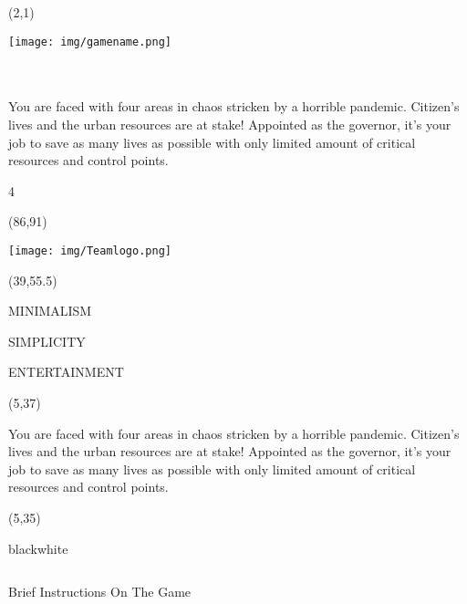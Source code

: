 \documentclass[hyperref={pdfpagelabels=false}]{beamer}
\begin{document}
\begin{frame}

	\begin{textblock}{45}(2,1)
		\begin{blankbox}
			\texttt{[image: img/gamename.png]} \\\hspace*{\fill} \\ \\\hspace*{\fill}

			\huge{You are faced with four areas in chaos stricken by a horrible pandemic. Citizen's lives and the urban resources are at stake! Appointed as the governor, it's your job to save as many lives as possible with only limited amount of critical resources and control points.}
		\end{blankbox}
	\end{textblock}

4	\begin{textblock}{30}(86,91)
		\begin{blankbox}
			\texttt{[image: img/Teamlogo.png]}

		\end{blankbox}
	\end{textblock}

	\begin{textblock}{20}(39,55.5)
		\begin{blankbox}
\centering
			\Huge MINIMALISM

\vspace{1cm}

			SIMPLICITY
\vspace{1cm}

ENTERTAINMENT
		\end{blankbox}
	\end{textblock}



\begin{textblock}{45}(5,37)
		\begin{blankbox}
	
			\huge{You are faced with four areas in chaos stricken by a horrible pandemic. Citizen's lives and the urban resources are at stake! Appointed as the governor, it's your job to save as many lives as possible with only limited amount of critical resources and control points.}
		\end{blankbox}
	\end{textblock}
	\begin{textblock}{90}(5,35)
		\begin{baseroundedbox}[]{black}{white}
			\begin{columns}
			\Large{	\begin{column}{0.55\columnwidth}
					Brief Instructions On The Game \\\hspace*{\fill} \\


\end{column}}
\end{columns}
\end{baseroundedbox}
\end{textblock}
\end{frame}
\end{document}
